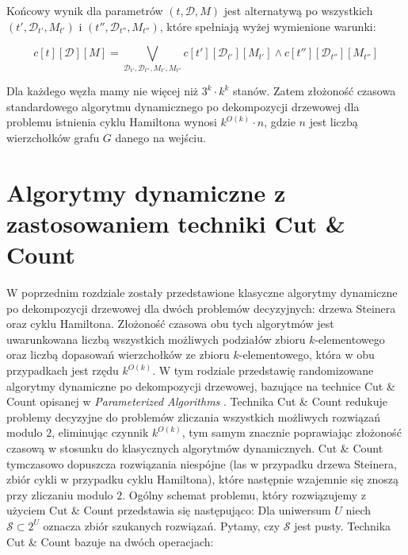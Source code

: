 \documentclass[12pt, oneside]{report}
\newcommand\Omicron{O}
\begin{document}
Końcowy wynik dla parametrów $(t, \mathcal{D}, M)$ jest alternatywą po wszystkich $(t', \mathcal{D}_{t'}, M_{t'})$ i $(t'', \mathcal{D}_{t''}, M_{t''})$, które spełniają wyżej wymienione warunki:

$$c[t][\mathcal{D}][M] = \bigvee \limits_{\mathcal{D}_{t'}, \mathcal{D}_{t''}, M_{t'}, M_{t''}} c[t'][\mathcal{D}_{t'}][M_{t'}] \wedge c[t''][\mathcal{D}_{t''}][M_{t''}]$$

Dla każdego węzła mamy nie więcej niż $3^k \cdot k^k$ stanów. Zatem złożoność czasowa standardowego algorytmu dynamicznego po dekompozycji drzewowej dla problemu istnienia cyklu Hamiltona wynosi $k^{\Omicron(k)} \cdot n$, gdzie $n$ jest liczbą wierzchołków grafu $G$ danego na wejściu. 

\newpage
  	\chapter{Algorytmy dynamiczne z zastosowaniem techniki Cut \& Count}

W poprzednim rozdziale zostały przedstawione klasyczne algorytmy dynamiczne po dekompozycji drzewowej dla dwóch problemów decyzyjnych: drzewa Steinera oraz cyklu Hamiltona. Złożoność czasowa obu tych algorytmów jest uwarunkowana liczbą wszystkich możliwych podziałów zbioru $k$-elementowego oraz liczbą dopasowań wierzchołków ze zbioru $k$-elementowego, która w obu przypadkach jest rzędu $k^{\Omicron{(k)}}$.
W tym rodziale przedstawię randomizowane algorytmy dynamiczne po dekompozycji drzewowej, bazujące na technice Cut \& Count opisanej w \emph{Parameterized Algorithms} \cite{parametrized_algorithms}. Technika Cut \& Count redukuje problemy decyzyjne do problemów zliczania wszystkich możliwych rozwiązań modulo $2$, eliminując czynnik $k^{\Omicron{(k)}}$, tym samym znacznie poprawiając złożoność czasową w stosunku do klasycznych algorytmów dynamicznych. Cut \& Count tymczasowo dopuszcza rozwiązania niespójne (las w przypadku drzewa Steinera, zbiór cykli w przypadku cyklu Hamiltona), które następnie wzajemnie się znoszą przy zliczaniu modulo $2$.\newline\newline
Ogólny schemat problemu, który rozwiązujemy z użyciem Cut \& Count przedstawia się następująco: 
Dla uniwersum $U$ niech $\mathcal{S} \subset 2^U$ oznacza zbiór szukanych rozwiązań. Pytamy, czy $\mathcal{S}$ jest pusty.\newline\newline
Technika Cut \& Count bazuje na dwóch operacjach:
\end{document}
